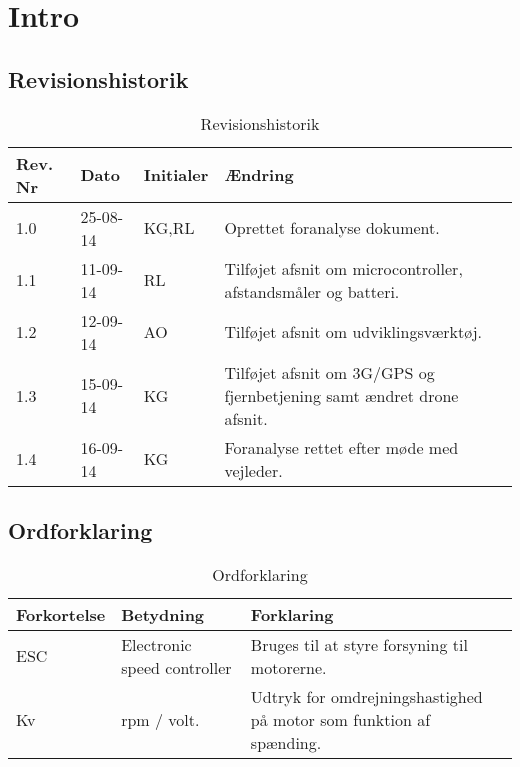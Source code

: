 \chapter{Intro}

\section{Revisionshistorik}
\begin{table}[H]
	\centering
		\begin{tabular}{|p{2 cm}|p{2 cm}|p{2 cm}|p{7 cm}|} 
		\hline
			\textbf{Rev. Nr} & \textbf{Dato}		& \textbf{Initialer} 	& \textbf{Ændring} \\ \hline
			1.0 	& 25-08-14	& KG,RL		& Oprettet foranalyse dokument.	\\ \hline
			1.1 	& 11-09-14	& RL		& Tilføjet afsnit om microcontroller, afstandsmåler og batteri.	\\ \hline
			1.2 	& 12-09-14	& AO		& Tilføjet afsnit om udviklingsværktøj.	\\ \hline	
			1.3 	& 15-09-14	& KG		& Tilføjet afsnit om 3G/GPS og fjernbetjening samt ændret drone afsnit.	\\ \hline
			1.4 	& 16-09-14	& KG		& Foranalyse rettet efter møde med vejleder.	\\ \hline
		\end{tabular}
	\caption{Revisionshistorik}
\end{table}

\vspace{.5cm}

\section{Ordforklaring}
\begin{table}[H]
	\centering
		\begin{tabular}{|p{2.5cm}|p{4.5 cm}|p{6.5 cm}|} 
		\hline
			\textbf{Forkortelse} & \textbf{Betydning} & \textbf{Forklaring} \\ \hline
			ESC & Electronic speed controller & Bruges til at styre forsyning til motorerne. \\ \hline
			Kv & rpm / volt. & Udtryk for omdrejningshastighed på motor som funktion af spænding. \\ \hline
		\end{tabular}
	\caption{Ordforklaring}
\end{table}



